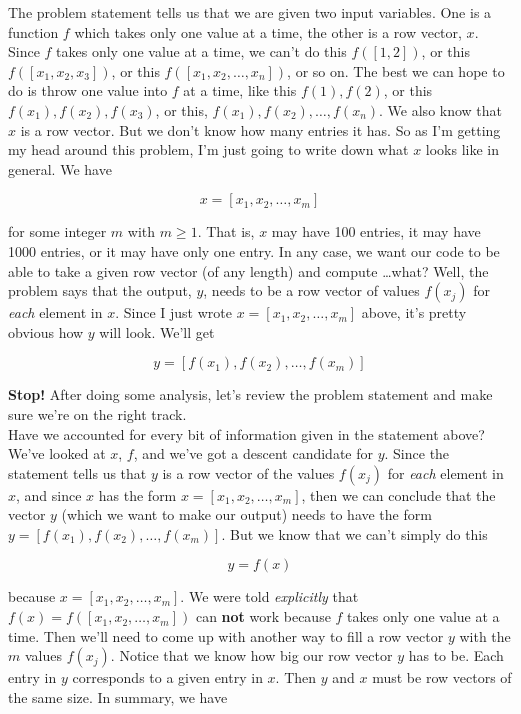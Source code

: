 \documentclass{article}
\begin{document}
The problem statement tells us that we are given two input variables. One is a function $f$ which takes only one value at a time, the other is a row vector, $x$. Since $f$ takes only one value at a time, we can't do this $f([1, 2])$, or this $f([x_1, x_2, x_3])$, or this $f([x_1, x_2, \dots, x_n])$, or so on. The best we can hope to do is throw one value into $f$ at a time, like this $f(1), f(2)$, or this $f(x_1), f(x_2), f(x_3)$, or this, $f(x_1), f(x_2), \dots, f(x_n)$. We also know that $x$ is a row vector. But we don't know how many entries it has. So as I'm getting my head around this problem, I'm just going to write down what $x$ looks like in general. We have

\[
x = [x_1, x_2, \dots, x_m]
\]

{\setlength{\parindent}{0cm}
for some integer $m$ with $m \geq 1$. That is, $x$ may have 100 entries, it may have 1000 entries, or it may have only one entry. In any case, we want our code to be able to take a given row vector (of any length) and compute \dots what? Well, the problem says that the output, $y$, needs to be a row vector of values $f(x_j)$ for \textit{each} element in $x$. Since I just wrote $x = [x_1, x_2, \dots, x_m]$ above, it's pretty obvious how $y$ will look. We'll get}

\[
y = [ f(x_1), f(x_2), \dots, f(x_m)]
\]

{\setlength{\parindent}{0cm}
\textbf{Stop!} After doing some analysis, let's review the problem statement and make sure we're on the right track.} \\

Have we accounted for every bit of information given in the statement above? We've looked at $x$, $f$, and we've got a descent candidate for $y$. Since the statement tells us that $y$ is a row vector of the values $f(x_j)$ for \textit{each} element in $x$, and since $x$ has the form $x = [x_1, x_2, \dots, x_m]$, then we can conclude that the vector $y$ (which we want to make our output) needs to have the form $y = [ f(x_1), f(x_2), \dots, f(x_m)]$. But we know that we can't simply do this

\[
y = f(x)
\]

{\setlength{\parindent}{0cm}
because $x = [ x_1, x_2, \dots, x_m]$. We were told \textit{explicitly} that $f(x) = f([x_1, x_2, \dots, x_m])$ can \textbf{not} work because $f$ takes only one value at a time. Then we'll need to come up with another way to fill a row vector $y$ with the $m$ values $f(x_j)$. Notice that we know how big our row vector $y$ has to be. Each entry in $y$ corresponds to a given entry in $x$. Then $y$ and $x$ must be row vectors of the same size. In summary, we have}
\end{document}
